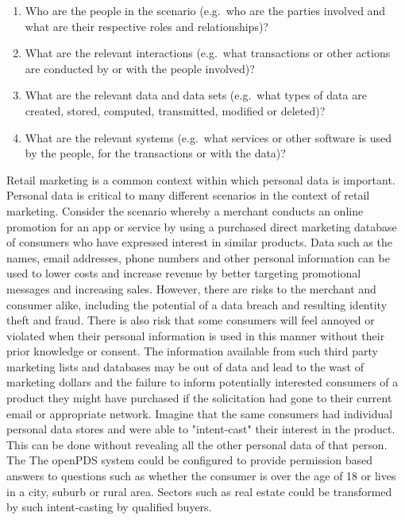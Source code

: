 \begin{enumerate}
\item Who are the people in the scenario (e.g.~who are the parties involved and what are their respective roles and relationships)? 
\item What are the relevant interactions (e.g.~what transactions or other actions are conducted by or with the people involved)?
\item What are the relevant data and data sets (e.g.~what types of data are created, stored, computed, transmitted, modified or deleted)?
\item What are the relevant systems (e.g.~what services or other software is used by the people, for the transactions or with the data)? 
\end{enumerate}

Retail marketing is a common context within which personal data is important.
Personal data is critical to many different scenarios in the context of retail marketing.  
Consider the scenario whereby a merchant conducts an online promotion for an app or service by using a purchased direct marketing database of consumers who have expressed interest in similar products.
Data such as the names, email addresses, phone numbers and other personal information can be used to lower costs and increase revenue by better targeting promotional messages and increasing sales.
However, there are risks to the merchant and consumer alike, including the potential of a data breach and resulting identity theft and fraud.
There is also risk that some consumers will feel annoyed or violated when their personal information is used in this manner without their prior knowledge or consent.
The information available from such third party marketing lists and databases may be out of data and lead to the wast of marketing dollars and the failure to inform potentially interested consumers of a product they might have purchased if the solicitation had gone to their current email or appropriate network.
Imagine that the same consumers had individual personal data stores and were able to "intent-cast" their interest in the product. 
This can be done without revealing all the other personal data of that person.
The  The openPDS system could be configured to provide permission based answers to questions such as whether the consumer is over the age of 18 or lives in a city, suburb or rural area.
Sectors such as real estate could be transformed by such intent-casting by qualified buyers.   

